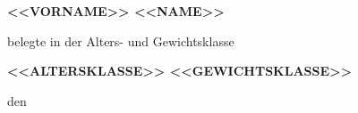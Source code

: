 \begin{center}
    \vspace*{10cm}

    {\huge \textbf{<<VORNAME>> <<NAME>>}}

    \vspace{1cm}

    belegte in der Alters- und Gewichtsklasse
    \vspace{1cm}

    {\huge \textbf{<<ALTERSKLASSE>> <<GEWICHTSKLASSE>>}}

    \vspace{1.5cm}

    den

    \vspace{1.5cm}


    \vspace{1cm}


\end{center}


